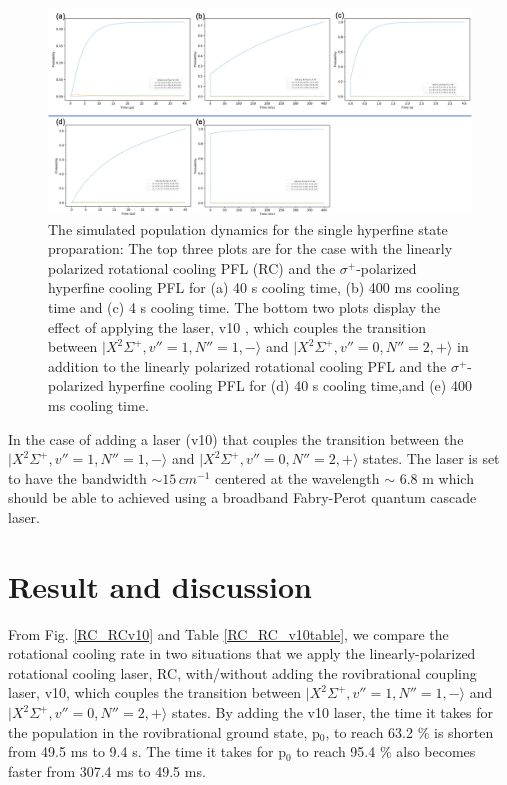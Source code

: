 \documentclass[aip,jcp,reprint]{revtex4-1}
\begin{document}
\begin{figure}[htbp!]
  \centering
  \includegraphics[width=18cm]{RCHC_RCHCv10}
  \caption
  { The simulated population dynamics for the single hyperfine state proparation: The top three plots are for the case with the linearly polarized rotational cooling PFL (RC) and the $\sigma^+$-polarized hyperfine cooling PFL for (a) 40 {\micro}s cooling time, (b) 400 ms cooling time and (c) 4 s cooling time. The bottom two plots display the effect of applying the laser, v10 , which couples the transition between $\lvert X^2\Sigma^+, v''=1, N''=1, -\rangle$ and $\lvert X^2\Sigma^+, v''=0, N''=2, +\rangle$ in addition to the linearly polarized rotational cooling PFL and the $\sigma^+$-polarized hyperfine cooling PFL for (d) 40 {\micro}s cooling time,and (e) 400 ms cooling time.
}\label{RCHC_RCHCv10}
\end{figure}


In the case of adding a laser (v10) that couples the transition between the $\lvert X^2\Sigma^+, v''=1, N''=1, -\rangle$ and $\lvert X^2\Sigma^+, v''=0, N''=2, +\rangle$ states. The laser is set to have the bandwidth $\sim 15\, cm^{-1}$ centered at the wavelength $\sim$ 6.8 {\micro}m which should be able to achieved using a broadband Fabry-Perot quantum cascade laser. 

\section{Result and discussion}
From Fig. \ref{RC_RCv10} and Table \ref{RC_RC_v10table}, we compare the rotational cooling rate in two situations that we apply the linearly-polarized rotational cooling laser, RC, with/without adding the rovibrational coupling laser, v10, which couples the transition between $\lvert X^2\Sigma^+, v''=1, N''=1, -\rangle$ and $\lvert X^2\Sigma^+, v''=0, N''=2, +\rangle$ states.  By adding the v10 laser, the time it takes for the population in the rovibrational ground state, p$_0$, to reach 63.2 $\%$ is shorten from 49.5 ms to 9.4 {\micro}s. The time it takes for p$_0$ to reach 95.4 $\%$ also becomes faster from 307.4 ms to 49.5 ms.
\end{document}
